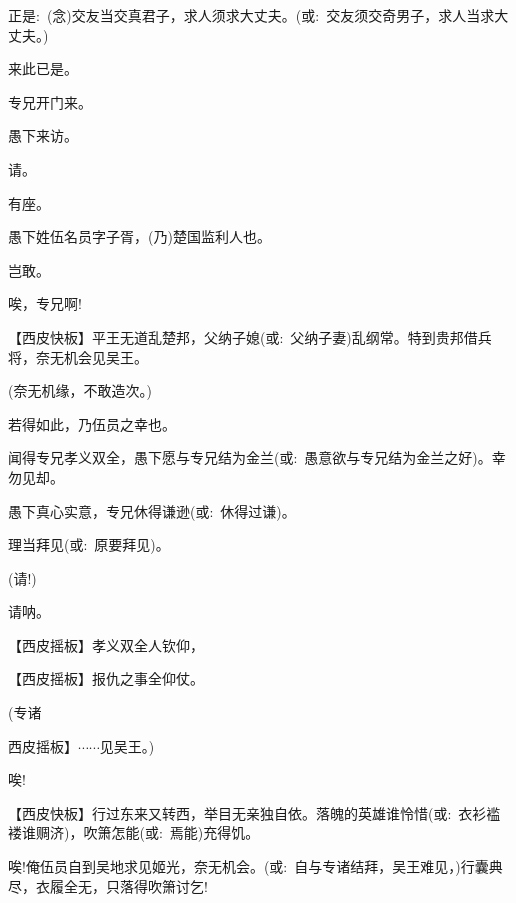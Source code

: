 {{正是:~({\akai 念})交友当交真君子，求人须求大丈夫。({\akai 或}:~交友须交奇男子，求人当求大丈夫。)}

{来此已是。}

{专兄开门来。}

{愚下来访。}

{请。}

{有座。}

{愚下姓伍名员字子胥，(乃)楚国监利人也。}

{岂敢。}

{唉，专兄啊!}

\setlength{\hangindent}{60pt} {【}西皮快板{】平王无道乱楚邦，父纳子媳({\akai 或}:~父纳子妻)乱纲常。特到贵邦借兵将，奈无机会见吴王。}

{(奈无机缘，不敢造次。)}

{若得如此，乃伍员之幸也。}

{闻得专兄孝义双全，愚下愿与专兄结为金兰({\akai 或}:~愚意欲与专兄结为金兰之好)。幸勿见却。}

{愚下真心实意，专兄休得谦逊({\akai 或}:~休得过谦)。}

{理当拜见({\akai 或}:~原要拜见)。}

{(请!)}

{请呐。}

\setlength{\hangindent}{60pt} {【}西皮摇板{】孝义双全人钦仰，}

\setlength{\hangindent}{60pt} {【}西皮摇板{】报仇之事全仰仗。}

{(专诸\hspace{30pt}~

西皮摇板{】$\cdots{}\cdots{}$见吴王。)} }

\vspace{5pt}

{唉!}

\setlength{\hangindent}{60pt} {【{\akai 西皮快板}】行过东来又转西，举目无亲独自依。落魄的英雄谁怜惜({\akai 或}:~衣衫褴褛谁赒济)，吹箫怎能({\akai 或}:~焉能)充得饥。}

{唉!俺伍员自到吴地求见姬光，奈无机会。({\akai 或}:~自与专诸结拜，吴王难见，)行囊典尽，衣履全无，只落得吹箫讨乞!}


}
